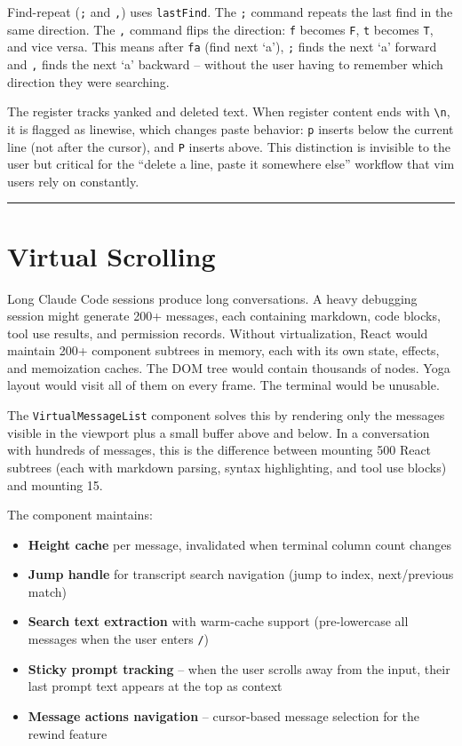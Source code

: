 \documentclass[
  english,
  11pt,
  letterpaper,
]{book}
\providecommand{\tightlist}{%
  \setlength{\itemsep}{0pt}\setlength{\parskip}{0pt}}
\begin{document}
Find-repeat (\texttt{;} and \texttt{,}) uses \texttt{lastFind}. The
\texttt{;} command repeats the last find in the same direction. The
\texttt{,} command flips the direction: \texttt{f} becomes \texttt{F},
\texttt{t} becomes \texttt{T}, and vice versa. This means after
\texttt{fa} (find next `a'), \texttt{;} finds the next `a' forward and
\texttt{,} finds the next `a' backward -- without the user having to
remember which direction they were searching.

The register tracks yanked and deleted text. When register content ends
with \texttt{\textbackslash{}n}, it is flagged as linewise, which
changes paste behavior: \texttt{p} inserts below the current line (not
after the cursor), and \texttt{P} inserts above. This distinction is
invisible to the user but critical for the ``delete a line, paste it
somewhere else'' workflow that vim users rely on constantly.

\begin{center}\rule{0.5\linewidth}{0.5pt}\end{center}

\section{Virtual Scrolling}\label{virtual-scrolling}

Long Claude Code sessions produce long conversations. A heavy debugging
session might generate 200+ messages, each containing markdown, code
blocks, tool use results, and permission records. Without
virtualization, React would maintain 200+ component subtrees in memory,
each with its own state, effects, and memoization caches. The DOM tree
would contain thousands of nodes. Yoga layout would visit all of them on
every frame. The terminal would be unusable.

The \texttt{VirtualMessageList} component solves this by rendering only
the messages visible in the viewport plus a small buffer above and
below. In a conversation with hundreds of messages, this is the
difference between mounting 500 React subtrees (each with markdown
parsing, syntax highlighting, and tool use blocks) and mounting 15.

The component maintains:

\begin{itemize}
\tightlist
\item
  \textbf{Height cache} per message, invalidated when terminal column
  count changes
\item
  \textbf{Jump handle} for transcript search navigation (jump to index,
  next/previous match)
\item
  \textbf{Search text extraction} with warm-cache support (pre-lowercase
  all messages when the user enters \texttt{/})
\item
  \textbf{Sticky prompt tracking} -- when the user scrolls away from the
  input, their last prompt text appears at the top as context
\item
  \textbf{Message actions navigation} -- cursor-based message selection
  for the rewind feature
\end{itemize}
\end{document}
